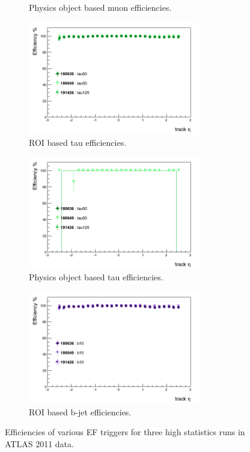 \begin{figure}[htbp]
\begin{subfigure}{.5\linewidth}
		\caption{Physics object based muon efficiencies.}
		\label{fig:trig_2011_EF_eta_d}
	\end{subfigure}
	\begin{subfigure}{.5\linewidth}	
		\centering
		\includegraphics[width=75mm]{f/tau50_IDTrkNoCut_eta_EF_eff}
		\caption{ROI based tau efficiencies.}
		\label{fig:trig_2011_EF_eta_e}
	\end{subfigure}
	\begin{subfigure}{.5\linewidth}	
		\centering
		\includegraphics[width=75mm]{f/tau50_IDTrkNoCut_eta_EF_eff_comb}
		\caption{Physics object based tau efficiencies.}
		\label{fig:trig_2011_EF_eta_f}
	\end{subfigure}
	\begin{center}
	\begin{subfigure}{.5\linewidth}	
		\centering
		\includegraphics[width=75mm]{f/b10_IDTrkNoCut_eta_EF_eff}
		\caption{ROI based b-jet efficiencies.}
		\label{fig:trig_2011_EF_eta_g}
	\end{subfigure}
	\end{center}
	\caption{Efficiencies of various EF triggers for three high statistics runs in ATLAS 2011 data.}
	\label{fig:trig_2011_EF_eta}
\end{figure}

